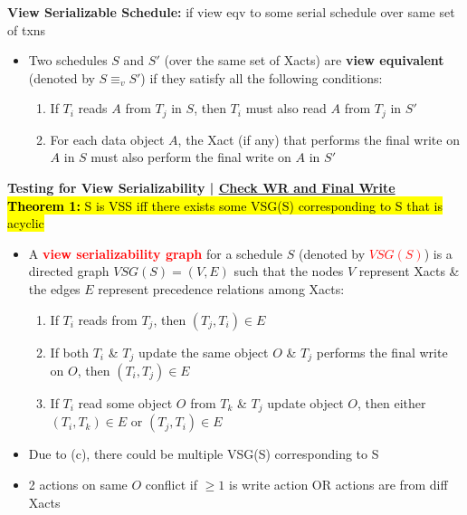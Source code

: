 \documentclass[10pt,landscape]{article}
\newcommand{\1}{\mathmybb{1}}
\begin{document}
\begin{multicols*}{3}
\textbf{View Serializable Schedule:} if view eqv to some serial schedule over same set of txns
\begin{itemize}
    \item Two schedules $S$ and $S'$ (over the same set of Xacts) are \textbf{view equivalent} (denoted by $S \equiv_v S'$) if they satisfy all the following conditions:
    \begin{enumerate}
        \item If $T_i$ reads $A$ from $T_j$ in $S$, then $T_i$ must also read $A$ from $T_j$ in $S'$
        \item For each data object $A$, the Xact (if any) that performs the final write on $A$ in $S$ must also perform the final write on $A$ in $S'$
    \end{enumerate}
\end{itemize}

\textbf{Testing for View Serializability | \underline{Check WR and Final Write}} \\ 
\hl{\textbf{Theorem 1:} S is VSS iff there exists some VSG(S) corresponding to S that is acyclic}
\begin{itemize}
    \item A \textcolor{red}{\textbf{view serializability graph}} for a schedule $S$ (denoted by \textcolor{red}{$VSG(S)$}) is a directed graph $VSG(S) = (V, E)$ such that the nodes $V$ represent Xacts \& the edges $E$ represent precedence relations among Xacts:
    \begin{enumerate}
        \item If $T_i$ reads from $T_j$, then $(T_j, T_i) \in E$
        \item If both $T_i$ \& $T_j$ update the same object $O$ \& $T_j$ performs the final write on $O$, then $(T_i, T_j) \in E$
        \item If $T_i$ read some object $O$ from $T_k$ \& $T_j$ update object $O$, then either $(T_i, T_k) \in E$ or $(T_j, T_i) \in E$
    \end{enumerate}
    \item Due to (c), there could be multiple VSG(S) corresponding to S
    \item 2 actions on same $O$ conflict if $\geq 1$ is write action OR actions are from diff Xacts
\end{itemize}


\end{multicols*}
\end{document}
